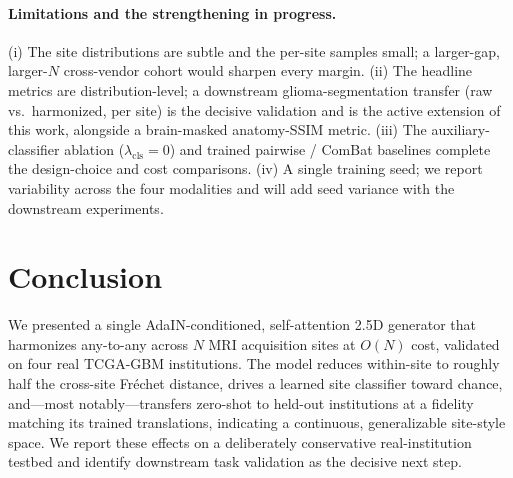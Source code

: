 \documentclass[runningheads]{llncs}
\begin{document}
\paragraph{Limitations and the strengthening in progress.}
(i) The site distributions are subtle and the per-site samples small; a
larger-gap, larger-$N$ cross-vendor cohort would sharpen every margin. (ii) The
headline metrics are distribution-level; a downstream glioma-segmentation transfer
(raw vs.\ harmonized, per site) is the decisive validation and is the active
extension of this work, alongside a brain-masked anatomy-SSIM metric. (iii) The
auxiliary-classifier ablation ($\lambda_{\mathrm{cls}}{=}0$) and trained pairwise /
ComBat baselines complete the design-choice and cost comparisons. (iv) A single
training seed; we report variability across the four modalities and will add seed
variance with the downstream experiments.

\section{Conclusion}
\label{sec:conclusion}
We presented a single AdaIN-conditioned, self-attention 2.5D generator that
harmonizes any-to-any across $N$ MRI acquisition sites at $O(N)$ cost, validated
on four real TCGA-GBM institutions. The model reduces within-site to roughly half
the cross-site Fr\'echet distance, drives a learned site classifier toward chance,
and---most notably---transfers zero-shot to held-out institutions at a fidelity
matching its trained translations, indicating a continuous, generalizable
site-style space. We report these effects on a deliberately conservative
real-institution testbed and identify downstream task validation as the decisive
next step.



\end{document}
